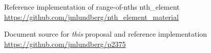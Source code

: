 \begin{thebibliography}{9}
Reference implementation of range-of-nths nth_element\\
\url{https://github.com/jmlundberg/nth_element_material}

Document source for \emph{this} proposal and reference implementation\\
\url{https://github.com/jmlundberg/p2375}

\end{thebibliography}
\let\addcontentsline\oldaddcontentsline%


